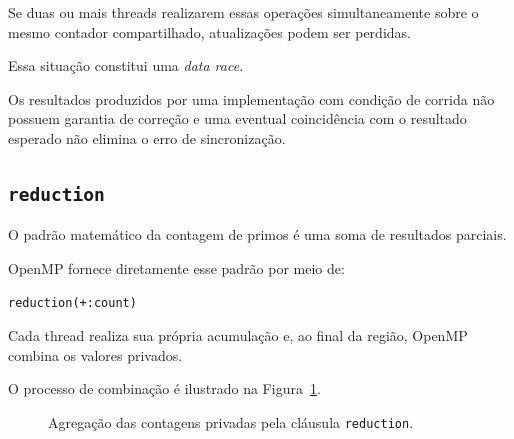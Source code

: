 Se duas ou mais threads realizarem essas operações simultaneamente sobre o
mesmo contador compartilhado, atualizações podem ser perdidas.

Essa situação constitui uma \textit{data race}.

Os resultados produzidos por uma implementação com condição de corrida não
possuem garantia de correção e uma eventual coincidência com o resultado
esperado não elimina o erro de sincronização.


\subsection{\texttt{reduction}}

O padrão matemático da contagem de primos é uma soma de resultados
parciais.

OpenMP fornece diretamente esse padrão por meio de:

\begin{verbatim}
reduction(+:count)
\end{verbatim}

Cada thread realiza sua própria acumulação e, ao final da região, OpenMP
combina os valores privados.

O processo de combinação é ilustrado na Figura~\ref{fig:atvd07-reduction}.

\begin{figure}[htbp]
    \centering
    \caption{Agregação das contagens privadas pela cláusula \texttt{reduction}.}
    \label{fig:atvd07-reduction}
\end{figure}

